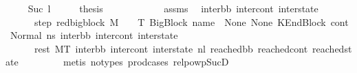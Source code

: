 \begin{isabellebody}
\isamarkupfalse%
\isanewline
\ \ \isamarkupfalse%
\ {}{\isacharcolon}{\kern0pt}\ {\isacharparenleft}{\kern0pt}Suc\ l{}{\isacharparenright}{\kern0pt}\isanewline
\ \ \isamarkupfalse%
\ \isamarkupfalse%
\ {\isacharquery}{\kern0pt}thesis\ \isanewline
\ \ \isamarkupfalse%
\ {\isacharminus}{\kern0pt}\isanewline
\ \ \ \ \isamarkupfalse%
\ {}\ assms\ \isamarkupfalse%
\ inter{\isacharunderscore}{\kern0pt}bb\ inter{\isacharunderscore}{\kern0pt}cont\ inter{\isacharunderscore}{\kern0pt}state\ \ \isanewline
\ \ \ \ \ \ step{}{\isacharcolon}{\kern0pt}\ {\isachardoublequoteopen}{\isacharparenleft}{\kern0pt}red{\isacharunderscore}{\kern0pt}bigblock\ M\ {\isasymLambda}\ {\isasymGamma}\ {\isasymOmega}\ T\ {\isacharparenleft}{\kern0pt}BigBlock\ name\ {\isacharbrackleft}{\kern0pt}{\isacharbrackright}{\kern0pt}\ None\ None{\isacharcomma}{\kern0pt}\ KEndBlock\ cont{}{\isacharcomma}{\kern0pt}\ Normal\ ns{}{\isacharparenright}{\kern0pt}\ {\isacharparenleft}{\kern0pt}inter{\isacharunderscore}{\kern0pt}bb{\isacharcomma}{\kern0pt}\ inter{\isacharunderscore}{\kern0pt}cont{\isacharcomma}{\kern0pt}\ inter{\isacharunderscore}{\kern0pt}state{\isacharparenright}{\kern0pt}{\isacharparenright}{\kern0pt}{\isachardoublequoteclose}\ \ \isanewline
\ \ \ \ \ \ rest{\isacharcolon}{\kern0pt}\ {\isachardoublequoteopen}M{\isacharcomma}{\kern0pt}{\isasymLambda}{\isacharcomma}{\kern0pt}{\isasymGamma}{\isacharcomma}{\kern0pt}{\isasymOmega}{\isacharcomma}{\kern0pt}T\ {\isasymturnstile}{\isacharparenleft}{\kern0pt}inter{\isacharunderscore}{\kern0pt}bb{\isacharcomma}{\kern0pt}\ inter{\isacharunderscore}{\kern0pt}cont{\isacharcomma}{\kern0pt}\ inter{\isacharunderscore}{\kern0pt}state{\isacharparenright}{\kern0pt}\ {\isacharminus}{\kern0pt}n{\isasymlongrightarrow}{\isacharcircum}{\kern0pt}l{}\ {\isacharparenleft}{\kern0pt}reached{\isacharunderscore}{\kern0pt}bb{\isacharcomma}{\kern0pt}\ reached{\isacharunderscore}{\kern0pt}cont{\isacharcomma}{\kern0pt}\ reached{\isacharunderscore}{\kern0pt}state{\isacharparenright}{\kern0pt}{\isachardoublequoteclose}\ \isanewline
\ \ \ \ \ \ \isamarkupfalse%
\ {\isacharparenleft}{\kern0pt}metis\ {\isacharparenleft}{\kern0pt}no{\isacharunderscore}{\kern0pt}types{\isacharparenright}{\kern0pt}\ prod{\isacharunderscore}{\kern0pt}cases{}\ relpowp{\isacharunderscore}{\kern0pt}Suc{\isacharunderscore}{\kern0pt}D{}{\isacharparenright}{\kern0pt}\isanewline

\end{isabellebody}
